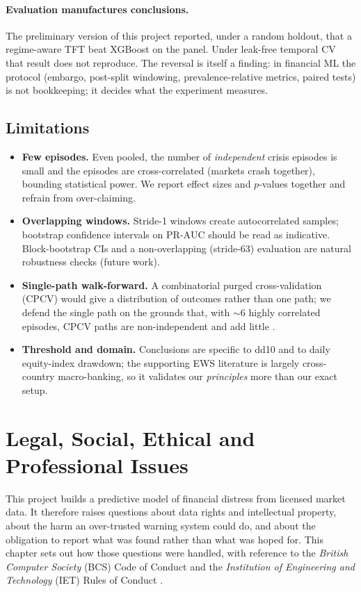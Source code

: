 \documentclass[11pt,a4paper]{article}
\newcommand{\prauc}{\mbox{PR-AUC}}
\begin{document}
\paragraph{Evaluation manufactures conclusions.} The preliminary version of
this project reported, under a random holdout, that a regime-aware TFT beat
XGBoost on the panel. Under leak-free temporal CV that result does not
reproduce. The reversal is itself a finding: in financial ML the protocol
(embargo, post-split windowing, prevalence-relative metrics, paired tests) is
not bookkeeping; it decides what the experiment measures.

\subsection{Limitations}
\label{sec:limits}
\begin{itemize}
\item \textbf{Few episodes.} Even pooled, the number of \emph{independent}
crisis episodes is small and the episodes are cross-correlated (markets crash
together), bounding statistical power. We report effect sizes and $p$-values
together and refrain from over-claiming.
\item \textbf{Overlapping windows.} Stride-1 windows create autocorrelated
samples; bootstrap confidence intervals on $\prauc$ should be read as
indicative. Block-bootstrap CIs and a non-overlapping (stride-63) evaluation
are natural robustness checks (future work).
\item \textbf{Single-path walk-forward.} A combinatorial purged
cross-validation (CPCV) would give a distribution of outcomes rather than one
path; we defend the single path on the grounds that, with $\sim$6 highly
correlated episodes, CPCV paths are non-independent and add little
\citep{lopezdeprado2018}.
\item \textbf{Threshold and domain.} Conclusions are specific to dd10 and to
daily equity-index drawdown; the supporting EWS literature is largely
cross-country macro-banking, so it validates our \emph{principles} more than
our exact setup.
\end{itemize}

\section{Legal, Social, Ethical and Professional Issues}
\label{sec:ethics}
This project builds a predictive model of financial distress from licensed
market data. It therefore raises questions about data rights and intellectual
property, about the harm an over-trusted warning system could do, and about the
obligation to report what was found rather than what was hoped for. This
chapter sets out how those questions were handled, with reference to the
\emph{British Computer Society} (BCS) Code of Conduct \citep{bcs2022code} and
the \emph{Institution of Engineering and Technology} (IET) Rules of Conduct
\citep{iet2023rules}.
\end{document}
